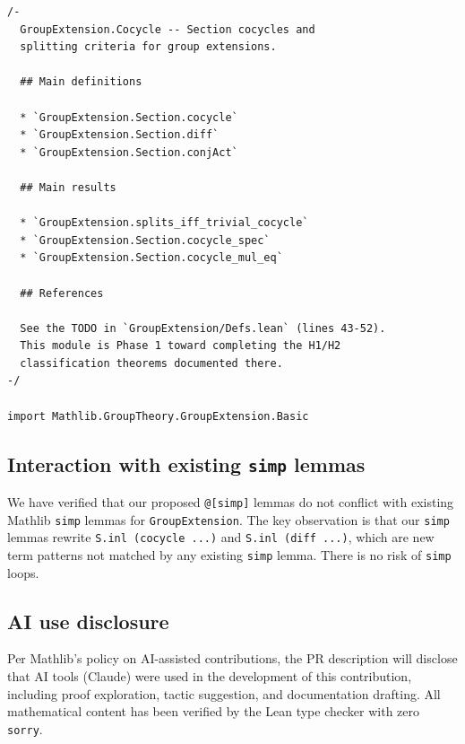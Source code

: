 \documentclass[11pt]{article}
\begin{document}
\begin{lstlisting}
/-
  GroupExtension.Cocycle -- Section cocycles and
  splitting criteria for group extensions.

  ## Main definitions

  * `GroupExtension.Section.cocycle`
  * `GroupExtension.Section.diff`
  * `GroupExtension.Section.conjAct`

  ## Main results

  * `GroupExtension.splits_iff_trivial_cocycle`
  * `GroupExtension.Section.cocycle_spec`
  * `GroupExtension.Section.cocycle_mul_eq`

  ## References

  See the TODO in `GroupExtension/Defs.lean` (lines 43-52).
  This module is Phase 1 toward completing the H1/H2
  classification theorems documented there.
-/

import Mathlib.GroupTheory.GroupExtension.Basic
\end{lstlisting}

\subsection{Interaction with existing \texttt{simp} lemmas}

We have verified that our proposed \texttt{@[simp]} lemmas do not conflict with
existing Mathlib \texttt{simp} lemmas for \texttt{GroupExtension}. The key observation
is that our \texttt{simp} lemmas rewrite \texttt{S.inl (cocycle ...)} and
\texttt{S.inl (diff ...)}, which are new term patterns not matched by any existing
\texttt{simp} lemma. There is no risk of \texttt{simp} loops.

\subsection{AI use disclosure}

Per Mathlib's policy on AI-assisted contributions, the PR description will disclose
that AI tools (Claude) were used in the development of this contribution, including
proof exploration, tactic suggestion, and documentation drafting. All mathematical
content has been verified by the Lean type checker with zero \texttt{sorry}.

\end{document}
